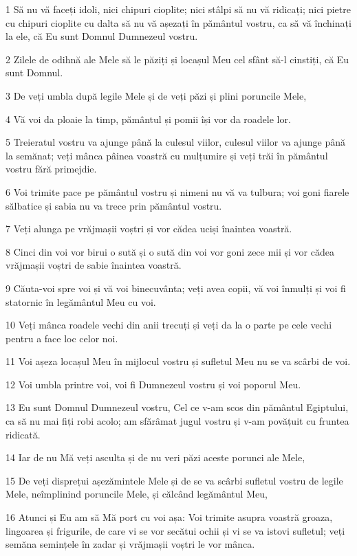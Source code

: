 \par 1 Să nu vă faceți idoli, nici chipuri cioplite; nici stâlpi să nu vă ridicați; nici pietre cu chipuri cioplite cu dalta să nu vă așezați în pământul vostru, ca să vă închinați la ele, că Eu sunt Domnul Dumnezeul vostru.
\par 2 Zilele de odihnă ale Mele să le păziți și locașul Meu cel sfânt să-l cinstiți, că Eu sunt Domnul.
\par 3 De veți umbla după legile Mele și de veți păzi și plini poruncile Mele,
\par 4 Vă voi da ploaie la timp, pământul și pomii își vor da roadele lor.
\par 5 Treieratul vostru va ajunge până la culesul viilor, culesul viilor va ajunge până la semănat; veți mânca pâinea voastră cu mulțumire și veți trăi în pământul vostru fără primejdie.
\par 6 Voi trimite pace pe pământul vostru și nimeni nu vă va tulbura; voi goni fiarele sălbatice și sabia nu va trece prin pământul vostru.
\par 7 Veți alunga pe vrăjmașii voștri și vor cădea uciși înaintea voastră.
\par 8 Cinci din voi vor birui o sută și o sută din voi vor goni zece mii și vor cădea vrăjmașii voștri de sabie înaintea voastră.
\par 9 Căuta-voi spre voi și vă voi binecuvânta; veți avea copii, vă voi înmulți și voi fi statornic în legământul Meu cu voi.
\par 10 Veți mânca roadele vechi din anii trecuți și veți da la o parte pe cele vechi pentru a face loc celor noi.
\par 11 Voi așeza locașul Meu în mijlocul vostru și sufletul Meu nu se va scârbi de voi.
\par 12 Voi umbla printre voi, voi fi Dumnezeul vostru și voi poporul Meu.
\par 13 Eu sunt Domnul Dumnezeul vostru, Cel ce v-am scos din pământul Egiptului, ca să nu mai fiți robi acolo; am sfărâmat jugul vostru și v-am povățuit cu fruntea ridicată.
\par 14 Iar de nu Mă veți asculta și de nu veri păzi aceste porunci ale Mele,
\par 15 De veți disprețui așezămintele Mele și de se va scârbi sufletul vostru de legile Mele, neîmplinind poruncile Mele, și călcând legământul Meu,
\par 16 Atunci și Eu am să Mă port cu voi așa: Voi trimite asupra voastră groaza, lingoarea și frigurile, de care vi se vor secătui ochii și vi se va istovi sufletul; veți semăna semințele în zadar și vrăjmașii voștri le vor mânca.
